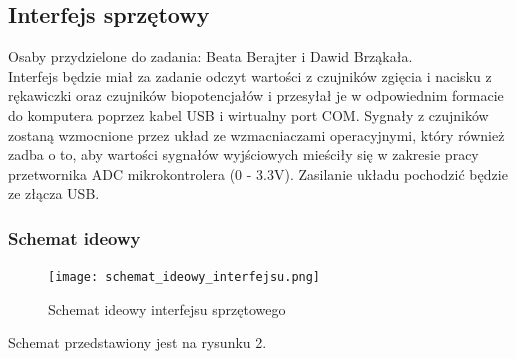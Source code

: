 \documentclass{article}
\begin{document}
\subsection{Interfejs sprzętowy}

Osaby przydzielone do zadania: Beata Berajter i Dawid Brząkała. \\
Interfejs będzie miał za zadanie odczyt wartości z czujników zgięcia i nacisku z rękawiczki oraz czujników biopotencjałów i przesyłał je w odpowiednim formacie do komputera poprzez kabel USB i wirtualny port COM. Sygnały z czujników zostaną wzmocnione przez układ ze wzmacniaczami operacyjnymi, który również zadba o to, aby wartości sygnałów wyjściowych mieściły się w zakresie pracy przetwornika ADC mikrokontrolera (0 - 3.3V). Zasilanie układu pochodzić będzie ze złącza USB.
\subsubsection{Schemat ideowy}
\begin{figure}[h!]
\centering
\texttt{[image: schemat\_ideowy\_interfejsu.png]}
\label{fig:interfejs}
\caption {Schemat ideowy interfejsu sprzętowego}

\end{figure}
Schemat przedstawiony jest na rysunku 2.
\end{document}

